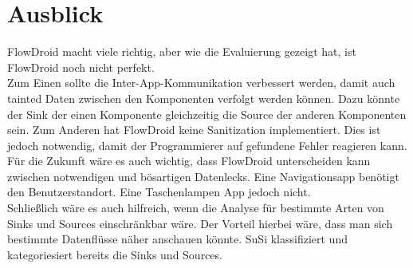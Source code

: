 \documentclass[runningheads]{llncs}
\begin{document}
\section{Ausblick} 
FlowDroid macht viele richtig, aber wie die Evaluierung gezeigt hat, ist FlowDroid noch nicht perfekt. 
\\Zum Einen sollte die Inter-App-Kommunikation verbessert werden, damit auch tainted Daten zwischen den Komponenten verfolgt werden können. Dazu könnte der Sink der einen Komponente gleichzeitig die Source der anderen Komponenten sein.
Zum Anderen hat FlowDroid keine Sanitization implementiert. Dies ist jedoch notwendig, damit der Programmierer auf gefundene Fehler reagieren kann. 
Für die Zukunft wäre es auch wichtig, dass FlowDroid unterscheiden kann zwischen notwendigen und bösartigen Datenlecks. Eine Navigationsapp benötigt den Benutzerstandort. Eine Taschenlampen App jedoch nicht.
\\Schließlich wäre es auch hilfreich, wenn die Analyse für bestimmte Arten von Sinks und Sources einschränkbar wäre. Der Vorteil hierbei wäre, dass man sich bestimmte Datenflüsse näher anschauen könnte. SuSi klassifiziert und kategoriesiert bereits die Sinks und Sources.
%
 
\nocite{*}


\end{document}
